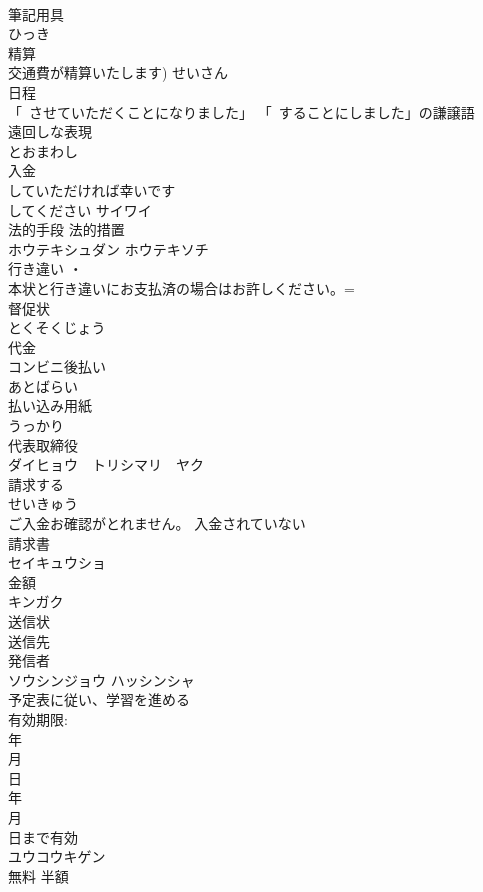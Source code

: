 \documentclass[8pt]{extreport}
\begin{document}
\begin{CJK}{UTF8}{min}
\\	筆記用具	
\\	ひっき
\\	精算	
\\	交通費が精算いたします) せいさん
\\	日程	
\\	「~させていただくことになりました」	「~することにしました」の謙譲語
\\	遠回しな表現	
\\	とおまわし
\\	入金	
\\	していただければ幸いです	
\\	してください サイワイ 
\\	法的手段 法的措置	
\\	ホウテキシュダン ホウテキソチ
\\	行き違い	・
\\	本状と行き違いにお支払済の場合はお許しください。= 
\\	督促状	
\\	とくそくじょう
\\	代金	
\\	コンビニ後払い	
\\	あとばらい
\\	払い込み用紙	
\\	うっかり	
\\	代表取締役	
\\	ダイヒョウ　トリシマリ　ヤク
\\	請求する	
\\	せいきゅう
\\	ご入金お確認がとれません。	入金されていない
\\	請求書	
\\	セイキュウショ
\\	金額	
\\	キンガク
\\	送信状 
\\	送信先 
\\	発信者	
\\	ソウシンジョウ ハッシンシャ
\\	予定表に従い、学習を進める	
\\	有効期限:
\\	年
\\	月
\\	日 
\\	年
\\	月
\\	日まで有効	
\\	ユウコウキゲン
\\	無料 半額 

\end{CJK}
\end{document}
